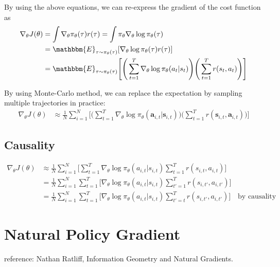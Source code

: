 By using the above equations, we can re-express the gradient of the cost function as
\begin{align*}
	\nabla_\theta J(\theta) &= \int \nabla_\theta \pi_\theta(\tau) r(\tau) = \int \pi_\theta \nabla_\theta \log \pi_\theta(\tau)\\
	&= \mathbbm{E}_{\tau\sim \pi_\theta(\tau)}[\nabla_\theta \log \pi_\theta(\tau)r(\tau)] \\
	&= \mathbbm{E}_{\tau\sim \pi_\theta(\tau)}\Bigg[\Bigg(\sum_{t=1}^{T}\nabla_\theta\log \pi_\theta(a_t|s_t)\Bigg)\Bigg(\sum_{t=1}^{T}r(s_t,a_t)\Bigg)\Bigg]
\end{align*}

By using Monte-Carlo method, we can replace the expectation by sampling multiple trajectories in practice:
\begin{align*}
	\nabla_\theta J(\theta) &\approx  \frac{1}{N}\sum_{i=1}^{N}\Bigg[\Bigg(\sum_{t=1}^{T}\nabla_\theta\log \pi_\theta(\mathbf{a}_{i,t}|\mathbf{s}_{i,t})\Bigg)\Bigg(\sum_{t=1}^{T}r(\mathbf{s}_{i,t}, \mathbf{a}_{i,t})\Bigg)\Bigg]
\end{align*}

\subsection{Causality}
\begin{align*}
	\nabla_\theta J(\theta) &\approx  \frac{1}{N}\sum_{i=1}^{N}\Bigg[\sum_{t=1}^{T}\nabla_\theta\log \pi_\theta(a_{i,t}|s_{i,t})\sum_{t=1}^{T}r(s_{i,t},a_{i,t})\Bigg]\\
	&= \frac{1}{N}\sum_{i=1}^{N}\sum_{t=1}^{T}\Bigg[\nabla_\theta\log \pi_\theta(a_{i,t}|s_{i,t})\sum_{t'=1}^{T}r(s_{i,t'},a_{i,t'})\Bigg]\\
	&= \frac{1}{N}\sum_{i=1}^{N}\sum_{t=1}^{T}\Bigg[\nabla_\theta\log \pi_\theta(a_{i,t}|s_{i,t})\sum_{t'=t}^{T}r(s_{i,t'},a_{i,t'})\Bigg] \quad \textrm{by causality}
\end{align*}



\section{Natural Policy Gradient}
reference: Nathan Ratliff, Information Geometry and Natural Gradients. 
